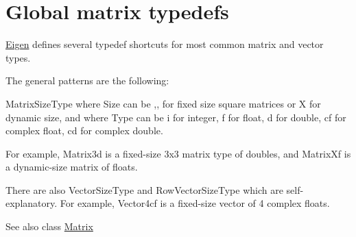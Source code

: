 \hypertarget{group__matrixtypedefs}{}\section{Global matrix typedefs}
\label{group__matrixtypedefs}
\hyperlink{namespace_eigen}{Eigen} defines several typedef shortcuts for most common matrix and vector types.

The general patterns are the following\+:

{\ttfamily Matrix\+Size\+Type} where {\ttfamily Size} can be {},{},{} for fixed size square matrices or {\ttfamily X} for dynamic size, and where {\ttfamily Type} can be {\ttfamily i} for integer, {\ttfamily f} for float, {\ttfamily d} for double, {\ttfamily cf} for complex float, {\ttfamily cd} for complex double.

For example, {\ttfamily Matrix3d} is a fixed-\/size 3x3 matrix type of doubles, and {\ttfamily Matrix\+Xf} is a dynamic-\/size matrix of floats.

There are also {\ttfamily Vector\+Size\+Type} and {\ttfamily Row\+Vector\+Size\+Type} which are self-\/explanatory. For example, {\ttfamily Vector4cf} is a fixed-\/size vector of 4 complex floats.

\begin{DoxySeeAlso}{See also}
class \hyperlink{group___core___module_class_eigen_1_1_matrix}{Matrix} 
\end{DoxySeeAlso}
